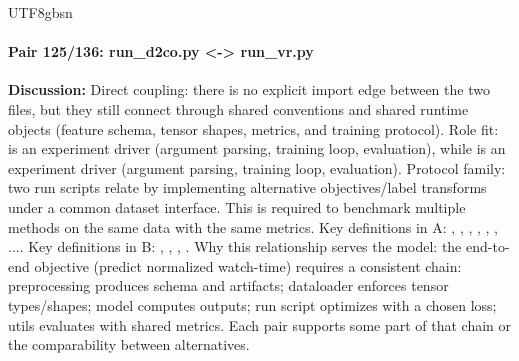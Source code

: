 \documentclass[11pt]{article}
\begin{document}
\begin{CJK*}{UTF8}{gbsn}
\paragraph{Pair 125/136: run\_d2co.py <-> run\_vr.py}
\textbf{Discussion:} Direct coupling: there is no explicit import edge between the two files, but they still connect through shared conventions and shared runtime objects (feature schema, tensor shapes, metrics, and training protocol). Role fit: \texttt{} is an experiment driver (argument parsing, training loop, evaluation), while \texttt{} is an experiment driver (argument parsing, training loop, evaluation). Protocol family: two run scripts relate by implementing alternative objectives/label transforms under a common dataset interface. This is required to benchmark multiple methods on the same data with the same metrics. Key definitions in A: \texttt{}, \texttt{}, \texttt{}, \texttt{}, \texttt{}, \texttt{}, .... Key definitions in B: \texttt{}, \texttt{}, \texttt{}, \texttt{}. Why this relationship serves the model: the end-to-end objective (predict normalized watch-time) requires a consistent chain: preprocessing produces schema and artifacts; dataloader enforces tensor types/shapes; model computes outputs; run script optimizes with a chosen loss; utils evaluates with shared metrics. Each pair supports some part of that chain or the comparability between alternatives.


\end{CJK*}
\end{document}
